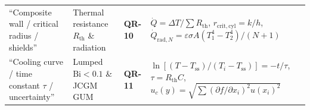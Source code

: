 \documentclass[10pt,twoside,openany,letterpaper]{book}
\begin{document}
\begin{quicksheet}
\begin{formulacard}
\begin{tabularx}{\linewidth}{@{}l l l X@{}}
``Composite wall / critical radius / shields'' & Thermal resistance $R_{\mathrm{th}}$ \& radiation & \textbf{QR-10} & $\dot{Q} = \Delta T/\sum R_{\mathrm{th}}$, $r_{\mathrm{crit,cyl}}=k/h$, $\dot{Q}_{\mathrm{rad},N} = \varepsilon\sigma A(T_1^4-T_2^4)/(N+1)$ \\
``Cooling curve / time constant $\tau$ / uncertainty'' & Lumped $\mathrm{Bi}<0.1$ \& JCGM GUM & \textbf{QR-11} & $\ln[(T-T_{\mathrm{ss}})/(T_i-T_{\mathrm{ss}})] = -t/\tau$, $\tau = R_{\mathrm{th}}C$, $u_c(y) = \sqrt{\sum (\partial f/\partial x_i)^2 u(x_i)^2}$ \\
\bottomrule
\end{tabularx}
\end{formulacard}
\end{quicksheet}

\end{document}
